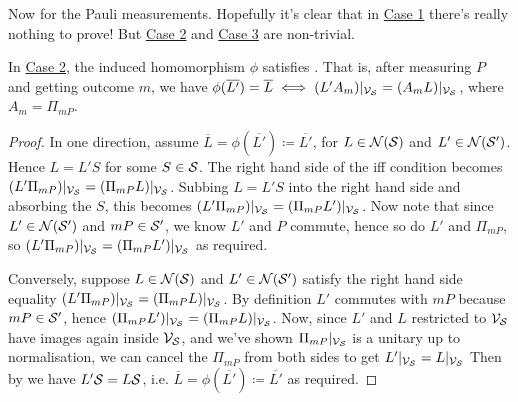 Now for the Pauli measurements.
Hopefully it's clear that in \hyperref[thm:stabilizer_group_update_measurement:case1]{Case 1} there's really nothing to prove!
But \hyperref[thm:stabilizer_group_update_measurement:case2]{Case 2} and \hyperref[thm:stabilizer_group_update_measurement:case3]{Case 3} are non-trivial.

\begin{proposition}
    In \hyperref[thm:stabilizer_group_update_measurement:case2]{Case 2}, the induced homomorphism $\phi$ satisfies .
    That is, after measuring $P$ and getting outcome $m$, we have $\phi(\overline{L'}) = \overline{L} \iff (L' A_m)|_{\mathcal{V}_{\mathcal{S}}} = (A_m L)|_{\mathcal{V}_{\mathcal{S}}}$, where $A_m = \Pi_{mP}$.
    \begin{proof}
        In one direction, assume $\overline{L} = \phi(\overline{L'}) \coloneqq \overline{L'}$, for $L \in \mathcal{N}(\mathcal{S})$ and $L' \in \mathcal{N}(\mathcal{S}')$.
        Hence $L = L'S$ for some $S \in \mathcal{S}$.
        The right hand side of the iff condition becomes $(L' \Pi_{mP})|_{\mathcal{V}_{\mathcal{S}}} = (\Pi_{mP} L)|_{\mathcal{V}_{\mathcal{S}}}$.
        Subbing $L = L'S$ into the right hand side and absorbing the $S$, this becomes $(L' \Pi_{mP})|_{\mathcal{V}_{\mathcal{S}}} = (\Pi_{mP} L')|_{\mathcal{V}_{\mathcal{S}}}$.
        Now note that since $L' \in \mathcal{N}(\mathcal{S}')$ and $mP \in \mathcal{S}'$, we know $L'$ and $P$ commute, hence so do $L'$ and $\Pi_{mP}$, so $(L' \Pi_{mP})|_{\mathcal{V}_{\mathcal{S}}} = (\Pi_{mP} L')|_{\mathcal{V}_{\mathcal{S}}}$ as required.

        Conversely, suppose $L \in \mathcal{N}(\mathcal{S})$ and $L' \in \mathcal{N}(\mathcal{S}')$ satisfy the right hand side equality $(L'
        \Pi_{mP})|_{\mathcal{V}_{\mathcal{S}}} = (\Pi_{mP} L)|_{\mathcal{V}_{\mathcal{S}}}$.
        By definition $L'$ commutes with $mP$ because $mP \in \mathcal{S}'$, hence $(\Pi_{mP} L')|_{\mathcal{V}_{\mathcal{S}}} = (\Pi_{mP} L)|_{\mathcal{V}_{\mathcal{S}}}$.
        Now, since $L'$ and $L$ restricted to $\mathcal{V}_{\mathcal{S}}$ have images again inside $\mathcal{V}_{\mathcal{S}}$, and we've shown $\Pi_{mP}|_{\mathcal{V}_{\mathcal{S}}}$ is a unitary up to normalisation, we can cancel the $\Pi_{mP}$ from both sides to get $L'|_{\mathcal{V}_{\mathcal{S}}} = L|_{\mathcal{V}_{\mathcal{S}}}$
        Then by  we have $L'\mathcal{S} = L\mathcal{S}$, i.e. $\overline{L} = \phi(\overline{L'}) \coloneqq \overline{L'}$ as required.
    \end{proof}
\end{proposition}

